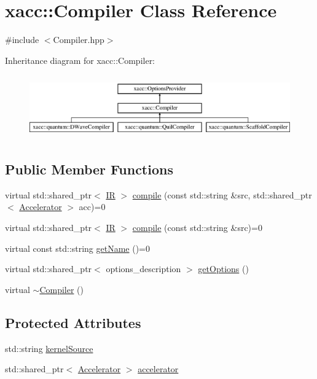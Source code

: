 \hypertarget{a00059}{}\section{xacc\+:\+:Compiler Class Reference}
\label{a00059}


{\ttfamily \#include $<$Compiler.\+hpp$>$}

Inheritance diagram for xacc\+:\+:Compiler\+:\begin{figure}[H]
\begin{center}
\leavevmode
\includegraphics[height=2.772277cm]{a00059}
\end{center}
\end{figure}
\subsection*{Public Member Functions}
\begin{DoxyCompactItemize}
\item 
virtual std\+::shared\+\_\+ptr$<$ \hyperlink{a00167}{IR} $>$ \hyperlink{a00059_a546a40c95bb93af6a0c0ac48dbeaffc8}{compile} (const std\+::string \&src, std\+::shared\+\_\+ptr$<$ \hyperlink{a00030}{Accelerator} $>$ acc)=0
\item 
virtual std\+::shared\+\_\+ptr$<$ \hyperlink{a00167}{IR} $>$ \hyperlink{a00059_a9092f5f779b570c91569b59621280c04}{compile} (const std\+::string \&src)=0
\item 
virtual const std\+::string \hyperlink{a00059_a87fca9100e6462122f5b687c3a0fb3fb}{get\+Name} ()=0
\item 
virtual std\+::shared\+\_\+ptr$<$ options\+\_\+description $>$ \hyperlink{a00059_a9f5a8965c9c2dd895016d18264ebbe92}{get\+Options} ()
\item 
virtual \hyperlink{a00059_a5d0b012687d9b44893872eaa81e47b38}{$\sim$\+Compiler} ()
\end{DoxyCompactItemize}
\subsection*{Protected Attributes}
\begin{DoxyCompactItemize}
\item 
std\+::string \hyperlink{a00059_a0ad81c816c09e5113d03cdc02165c453}{kernel\+Source}
\item 
std\+::shared\+\_\+ptr$<$ \hyperlink{a00030}{Accelerator} $>$ \hyperlink{a00059_ad4cbb467fa7e377bac6c054ffcb22b7c}{accelerator}
\end{DoxyCompactItemize}


